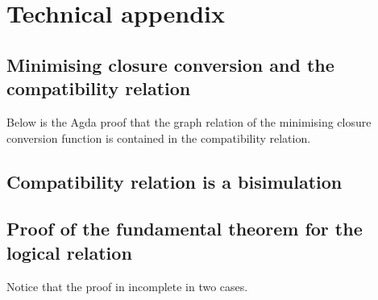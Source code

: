\documentclass[bsc,frontabs,oneside,singlespacing,parskip,deptreport]{infthesis}
\theoremstyle{definition}
\theoremstyle{lemma}
\begin{document}



\chapter{Technical appendix}
\label{cha:technical-appendix}

\section{Minimising closure conversion and the compatibility relation}
\label{sec:minim-clos-conv-2}

Below is the Agda proof that the graph relation of the minimising
closure conversion function is contained in the compatibility relation.


\section{Compatibility relation is a bisimulation}
\label{sec:comp-relat-bisim-1}


\section{Proof of the fundamental theorem for the logical relation}
\label{sec:proof-fund-theor}

Notice that the proof in incomplete in two cases.

\end{document}
